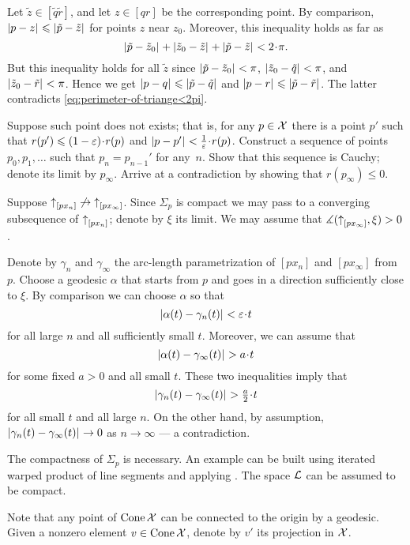 Let $\tilde z\in [\tilde q\tilde r]$,
and let $z\in [q r]$ be the corresponding point.
By comparison, $\dist pz{}\le\dist {\tilde p}{\tilde z}{}$ for points $z$ near $z_0$.
Moreover, this inequality holds as far as 
\[\dist{\tilde p}{\tilde z_0}{}+\dist{\tilde z_0}{\tilde z}{}+\dist{\tilde p}{\tilde z}{}<2\cdot\pi.\]
But this inequality holds for all $\tilde z$ since  $\dist{\tilde p}{\tilde z_0}{}<\pi$, $\dist{\tilde z_0}{\tilde q}{}<\pi$, and $\dist{\tilde z_0}{\tilde r}{}<\pi$.
Hence we get $\dist pq{}\le\dist {\tilde p}{\tilde q}{}$ and $\dist pr{}\le\dist {\tilde p}{\tilde r}{}$.
The latter contradicts \ref{eq:perimeter-of-triange<2pi}.

Suppose such point does not exists;
that is, for any $p\in \mathcal{X}$ there is a point $p'$ such that $r(p')\le  (1-\eps)\cdot r(p)$ and $\dist p{p'}{}<\tfrac{1}{\eps}\cdot r(p)$.
Construct a sequence of points $p_0,p_1,\dots$ such that $p_n=p_{n-1}'$ for any~$n$.
Show that this sequence is Cauchy; denote its limit by $p_\infty$.
Arrive at a contradiction by showing that $r(p_\infty)\le0$.

Suppose ${\uparrow}_{[{p}{x_n}]}\not\to{\uparrow}_{[{p}{x_\infty}]}$.
Since $\Sigma_p$ is compact we may pass to a converging subsequence of ${\uparrow}_{[{p}{x_n}]}$;
denote by $\xi$ its limit.
We may assume that $\measuredangle ({\uparrow}_{[{p}{x_\infty}]},\xi)>0$.

Denote by $\gamma_n$ and $\gamma_\infty$ the arc-length parametrization of $[px_n]$ and $[px_\infty]$ from $p$.
Choose a geodesic $\alpha$ that starts from $p$ and goes in a direction sufficiently close to $\xi$.
By comparison we can choose $\alpha$ so that
\[\dist{\alpha(t)}{\gamma_n(t)}{}<\eps\cdot t\]
for all large $n$ and all sufficiently small $t$.
Moreover, we can assume that
\[\dist{\alpha(t)}{\gamma_\infty(t)}{}>a\cdot t\]
for some fixed $a>0$ and all small $t$.
These two inequalities imply 
that 
\[\dist{\gamma_n(t)}{\gamma_\infty(t)}{}>\tfrac a2\cdot t\]
for all small $t$ and all large $n$.
On the other hand, by assumption, $\dist{\gamma_n(t)}{\gamma_\infty(t)}{}\to0$ as $n\to\infty$ --- a contradiction.

The compactness of $\Sigma_p$ is necessary.
An example can be built using iterated warped product of line segments and applying \cite[Theorem 1.2]{alexander-bishop2004}.
The space $\mathcal{L}$ can be assumed to be compact.


Note that any point of $\mathop{\rm Cone}\nolimits \mathcal{X}$ can be connected to the origin by a geodesic.
Given a nonzero element $v\in\mathop{\rm Cone}\nolimits \mathcal{X}$, denote by $v'$ its projection in $\mathcal{X}$.

